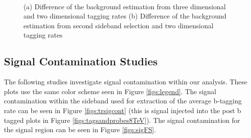 \begin{figure}[Htcb]
\begin{center}
\\
\caption{
(a) Difference of the background estimation from three dimensional and two dimensional tagging rates
(b) Difference of the background estimation from second sideband selection and two dimensional tagging rates
}
\label{figs:sb2comp}
\end{center}
\end{figure}


\subsection{Signal Contamination Studies}
\label{sec:sigcont}
The following studies investigate signal contamination within our analysis.  These plots use the same color scheme seen in Figure \ref{figs:legend}.  
The signal contamination within the sideband used for extraction of the average b-tagging rate can be seen in Figure \ref{figs:trsigcont} (this is signal injected 
into the post b tagged plots in Figure \ref{figs:tagsandprobes8TeV}).  The signal contamination for the signal region can be seen in Figure \ref{figs:sigFS}.

